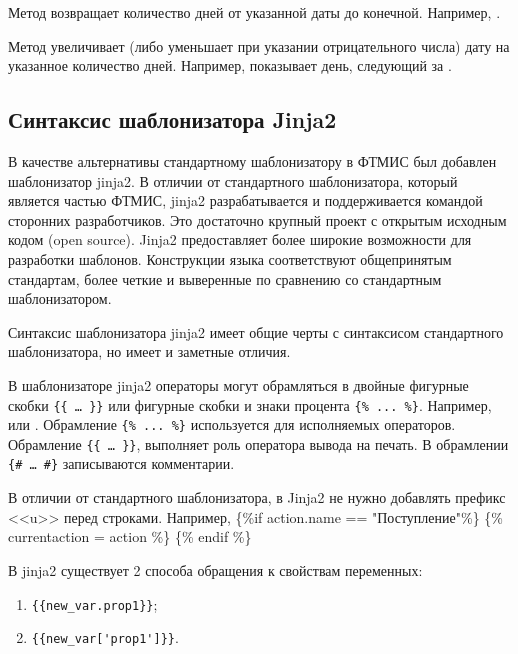 Метод  возвращает количество дней от указанной даты до конечной. Например, .

Метод  увеличивает (либо уменьшает при указании отрицательного числа) дату на указанное количество дней. Например,  показывает день, следующий за .

\subsection{Синтаксис шаблонизатора Jinja2}

В качестве альтернативы стандартному шаблонизатору в ФТМИС был добавлен шаблонизатор jinja2. В отличии от стандартного шаблонизатора, который является частью ФТМИС, jinja2 разрабатывается и поддерживается командой сторонних разработчиков. Это достаточно крупный проект с открытым исходным кодом (open source). Jinja2 предоставляет более широкие возможности для разработки шаблонов. Конструкции языка соответствуют общепринятым стандартам, более четкие и выверенные по сравнению со стандартным шаблонизатором.

Синтаксис шаблонизатора jinja2 имеет общие черты с синтаксисом стандартного шаблонизатора, но имеет и заметные отличия.

В шаблонизаторе jinja2 операторы могут обрамляться в двойные фигурные скобки \verb|{{ … }}| или фигурные скобки и знаки процента \verb|{% ... %}|. Например,  или . Обрамление \verb|{% ... %}| используется для исполняемых операторов. Обрамление \verb|{{ … }}|, выполняет роль оператора вывода на печать. В обрамлении \verb|{# … #}| записываются комментарии.

\begin{vnim}
 В отличии от стандартного шаблонизатора, в Jinja2 не нужно добавлять префикс <<u>> перед строками. Например,  \{\%if action.name == "Поступление"\%\} \{\% currentaction = action \%\} \{\% endif \%\}
\end{vnim}
 
В jinja2 существует 2 способа обращения к свойствам переменных:
\begin{enumerate}
 \item \verb|{{new_var.prop1}}|;
 \item \verb|{{new_var['prop1']}}|.
\end{enumerate}

